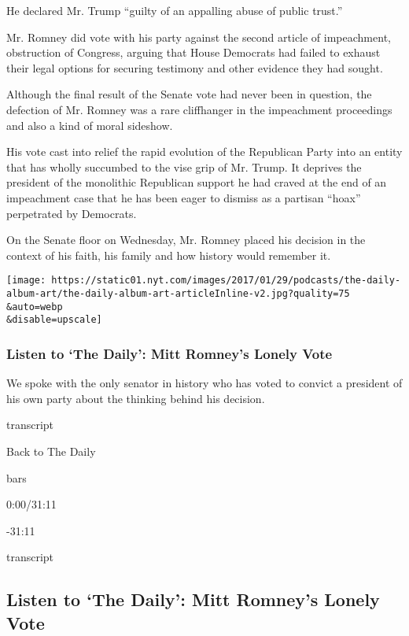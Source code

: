 He declared Mr. Trump ``guilty of an appalling abuse of public trust.''

Mr. Romney did vote with his party against the second article of
impeachment, obstruction of Congress, arguing that House Democrats had
failed to exhaust their legal options for securing testimony and other
evidence they had sought.

Although the final result of the Senate vote had never been in question,
the defection of Mr. Romney was a rare cliffhanger in the impeachment
proceedings and also a kind of moral sideshow.

His vote cast into relief the rapid evolution of the Republican Party
into an entity that has wholly succumbed to the vise grip of Mr. Trump.
It deprives the president of the monolithic Republican support he had
craved at the end of an impeachment case that he has been eager to
dismiss as a partisan ``hoax'' perpetrated by Democrats.

On the Senate floor on Wednesday, Mr. Romney placed his decision in the
context of his faith, his family and how history would remember it.

\texttt{[image: https://static01.nyt.com/images/2017/01/29/podcasts/the-daily-album-art/the-daily-album-art-articleInline-v2.jpg?quality=75\\\&auto=webp\\\&disable=upscale]}

\hypertarget{listen-to-the-daily-mitt-romneys-lonely-vote}{%
\subsubsection{Listen to `The Daily': Mitt Romney's Lonely
Vote}\label{listen-to-the-daily-mitt-romneys-lonely-vote}}

We spoke with the only senator in history who has voted to convict a
president of his own party about the thinking behind his decision.

transcript

Back to The Daily

bars

0:00/31:11

-31:11

transcript

\hypertarget{listen-to-the-daily-mitt-romneys-lonely-vote-1}{%
\subsection{Listen to `The Daily': Mitt Romney's Lonely
Vote}\label{listen-to-the-daily-mitt-romneys-lonely-vote-1}}


